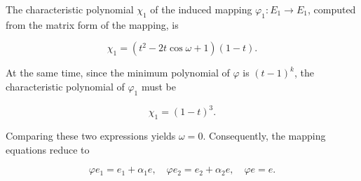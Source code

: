 The characteristic polynomial $\chi_1$ of the induced mapping $\varphi_1: E_1 \to E_1$, computed from the matrix form of the mapping, is

$$\chi_1 = (t^2 - 2t \cos \omega + 1)(1 - t).$$

At the same time, since the minimum polynomial of $\varphi$ is $(t-1)^k$, the characteristic polynomial of $\varphi_1$ must be

$$\chi_1 = (1 - t)^3.$$

Comparing these two expressions yields $\omega = 0$. Consequently, the mapping equations reduce to

$$\varphi e_1 = e_1 + \alpha_1 e, \quad \varphi e_2 = e_2 + \alpha_2 e, \quad \varphi e = e.$$
